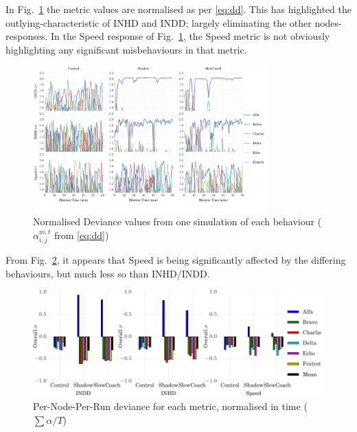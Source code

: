 \documentclass[conference,compsoc,letterpaper]{IEEEtran}
\begin{document}

In Fig.~\ref{fig:deviance_values} the metric values are normalised as per \eqref{eq:dd}.
This has highlighted the outlying-characteristic of INHD and INDD; largely eliminating the other nodes-responses.
In the Speed response of Fig.~\ref{fig:deviance_values}, the Speed metric is not obviously highlighting any significant misbehaviours in that metric. 

\begin{figure}
  \centering
  \includegraphics[width=0.8\textwidth]{Metric_Sigma_Deviance}
  \caption{Normalised Deviance values from one simulation of each behaviour ($\alpha_{i,j}^{m,t}$ from \eqref{eq:dd})}
  \label{fig:deviance_values}
\end{figure}

From Fig.~\ref{fig:summedsigmabar}, it appears that Speed is being significantly affected by the differing behaviours, but much less so than INHD/INDD.  

\begin{figure}
  \centering
  \includegraphics[width=\linewidth]{summedsigmabar}
  \caption{Per-Node-Per-Run deviance for each metric, normalised in time ($\sum\alpha/T$)}
  \label{fig:summedsigmabar}
\end{figure}
\end{document}
